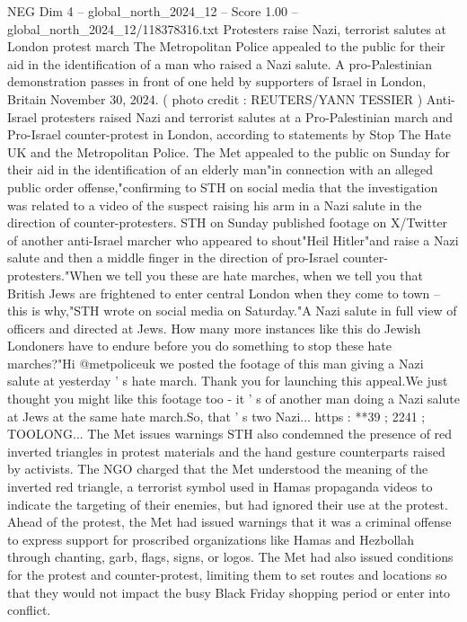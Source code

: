 \begin{textsample}{NEG Dim 4 – global\_north\_2024\_12 – Score 1.00 – global\_north\_2024\_12/118378316.txt}  \label{ex:f4_neg_140}
Protesters raise Nazi, terrorist salutes at London protest march The Metropolitan Police appealed to the public for their aid in the identification of a man who raised a Nazi salute.
A pro-Palestinian demonstration passes in front of one held by supporters of Israel in London, Britain November 30, 2024. ( photo credit : REUTERS/YANN TESSIER ) Anti-Israel protesters raised Nazi and terrorist salutes at a Pro-Palestinian march and Pro-Israel counter-protest in London, according to statements by Stop The Hate UK and the Metropolitan Police.
The Met appealed to the public on Sunday for their aid in the identification of an elderly man"in connection with an alleged public order offense,"confirming to STH on social media that the investigation was related to a video of the suspect raising his arm in a Nazi salute in the direction of counter-protesters.
STH on Sunday published footage on X/Twitter of another anti-Israel marcher who appeared to shout"Heil Hitler"and raise a Nazi salute and then a middle finger in the direction of pro-Israel counter-protesters."When we tell you these are hate marches, when we tell you that British Jews are frightened to enter central London when they come to town -- this is why,"STH wrote on social media on Saturday."A Nazi salute in full view of officers and directed at Jews.
How many more instances like this do Jewish Londoners have to endure before you do something to stop these hate marches?"Hi @metpoliceuk we posted the footage of this man giving a Nazi salute at yesterday ' s hate march.
Thank you for launching this appeal.We just thought you might like this footage too - it ' s of another man doing a Nazi salute at Jews at the same hate march.So, that ' s two Nazi... https : **39 ; 2241 ; TOOLONG...
The Met issues warnings STH also condemned the presence of red inverted triangles in protest materials and the hand gesture counterparts raised by activists.
The NGO charged that the Met understood the meaning of the inverted red triangle, a terrorist symbol used in Hamas propaganda videos to indicate the targeting of their enemies, but had ignored their use at the protest.
Ahead of the protest, the Met had issued warnings that it was a criminal offense to express support for proscribed organizations like Hamas and Hezbollah through chanting, garb, flags, signs, or logos.
The Met had also issued conditions for the protest and counter-protest, limiting them to set routes and locations so that they would not impact the busy Black Friday shopping period or enter into conflict.

\end{textsample}
